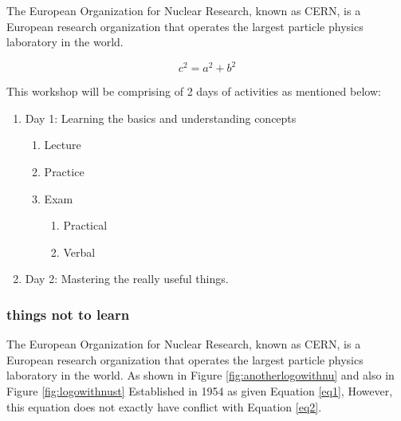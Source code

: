 The European Organization for Nuclear Research, known as CERN, is a European research organization that operates the largest particle physics laboratory in the world.

\begin{equation}\label{eq2}
 c^2 = a^2 + b^2
\end{equation}

This workshop will be comprising of 2 days of activities as mentioned below:
\begin{enumerate}
    \item Day 1: Learning the basics and understanding concepts
    \begin{enumerate}
        \item Lecture
        \item Practice
        \item Exam
        \begin{enumerate}
            \item Practical
            \item Verbal
        \end{enumerate}
    \end{enumerate}
    \item Day 2: Mastering the really useful things.
\end{enumerate}

\subsubsection{things not to learn}
The European Organization for Nuclear Research, known as CERN, is a European research organization that operates the largest particle physics laboratory in the world. As shown in Figure \ref{fig:anotherlogowithnu} and also in Figure \ref{fig:logowithnust} Established in 1954 as given Equation \ref{eq1}, However, this equation does not exactly have conflict with Equation \ref{eq2}.